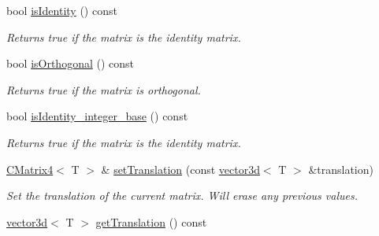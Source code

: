 \begin{DoxyCompactItemize}
\mbox{\label{classirr_1_1core_1_1CMatrix4_a01fb063cdc136aaa827c883a3ab6cac4}} 
bool \hyperlink{classirr_1_1core_1_1CMatrix4_a01fb063cdc136aaa827c883a3ab6cac4}{is\+Identity} () const
\begin{DoxyCompactList}\small\item\em Returns true if the matrix is the identity matrix. \end{DoxyCompactList}\item 
\mbox{\label{classirr_1_1core_1_1CMatrix4_a7166c462168855cb8c6aeb2fb76fa3cb}} 
bool \hyperlink{classirr_1_1core_1_1CMatrix4_a7166c462168855cb8c6aeb2fb76fa3cb}{is\+Orthogonal} () const
\begin{DoxyCompactList}\small\item\em Returns true if the matrix is orthogonal. \end{DoxyCompactList}\item 
\mbox{\label{classirr_1_1core_1_1CMatrix4_ad4fc4d401a2b40074b62882873c71e62}} 
bool \hyperlink{classirr_1_1core_1_1CMatrix4_ad4fc4d401a2b40074b62882873c71e62}{is\+Identity\+\_\+integer\+\_\+base} () const
\begin{DoxyCompactList}\small\item\em Returns true if the matrix is the identity matrix. \end{DoxyCompactList}\item 
\mbox{\label{classirr_1_1core_1_1CMatrix4_ac04a3b341cbfbb7986be682691655622}} 
\hyperlink{classirr_1_1core_1_1CMatrix4}{C\+Matrix4}$<$ T $>$ \& \hyperlink{classirr_1_1core_1_1CMatrix4_ac04a3b341cbfbb7986be682691655622}{set\+Translation} (const \hyperlink{classirr_1_1core_1_1vector3d}{vector3d}$<$ T $>$ \&translation)
\begin{DoxyCompactList}\small\item\em Set the translation of the current matrix. Will erase any previous values. \end{DoxyCompactList}\item 
\mbox{\label{classirr_1_1core_1_1CMatrix4_a574f83a4c1c6809f71ccb200020983f7}} 
\hyperlink{classirr_1_1core_1_1vector3d}{vector3d}$<$ T $>$ \hyperlink{classirr_1_1core_1_1CMatrix4_a574f83a4c1c6809f71ccb200020983f7}{get\+Translation} () const

\end{DoxyCompactItemize}
